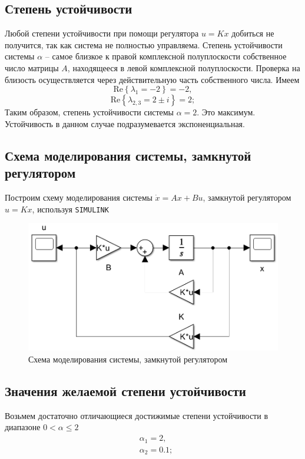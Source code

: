 \documentclass[a4paper, 12pt]{article}
\begin{document}
    \subsection{Степень устойчивости}
    Любой степени устойчивости при помощи регулятора $u=Kx$ добиться не получится, так как система не полностью управляема.
    Степень устойчивости системы $\alpha$ -- самое близкое
    к правой комплексной полуплоскости собственное число матрицы $A$,
    находящееся в левой комплексной полуплоскости. Проверка на близость
    осуществляется через действительную часть собственного числа. Имеем
    $$
    \text{Re}\left\{ \lambda_1=-2 \right\}=-2,
    $$
    $$\text{Re}\left\{ \lambda_{2,3}=2\pm i \right\}=2;
    $$
    Таким образом, степень устойчивости системы $\alpha=2$. Это максимум. Устойчивость в данном случае
    подразумевается экспоненциальная.


    \subsection{Схема моделирования системы, замкнутой регулятором}
    Построим схему моделирования системы $\dot{x}=Ax+Bu$, замкнутой регулятором $u=Kx$, используя \texttt{SIMULINK}
    \begin{figure}[H]
        \centering
        \includegraphics[scale=0.5]{scheme_task1.png}
        \captionsetup{skip=0pt}
        \caption{Схема моделирования системы, замкнутой регулятором}
        \label{fig:scheme_task1}
    \end{figure}


    \subsection{Значения желаемой степени устойчивости}
    Возьмем достаточно отличающиеся достижимые степени устойчивости в диапазоне $0<\alpha\leq2$
    \begin{align*}
        &\alpha_{1}=2,\\
        &\alpha_2=0.1;
    \end{align*}
\end{document}
